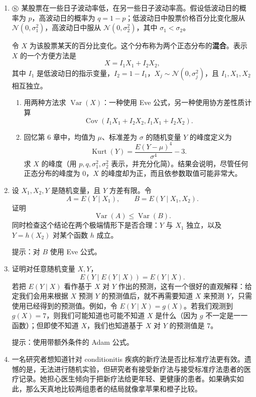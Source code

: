 \documentclass[UTF8,12pt,a4paper,fontset=fandol]{ctexart}
\begin{document}
\begin{enumerate}
  \item $\circledS$ 某股票在一些日子波动率低，在另一些日子波动率高。假设低波动日的概率为 $p$，高波动日的概率为 $q=1-p$；低波动日中股票价格百分比变化服从 $\mathcal N(0,\sigma_1^2)$，高波动日中服从 $\mathcal N(0,\sigma_2^2)$，其中 $\sigma_1<\sigma_2$。

  令 $X$ 为该股票某天的百分比变化。这个分布称为两个正态分布的\textbf{混合}。表示 $X$ 的一个方便方法是
  \[
    X=I_1X_1+I_2X_2,
  \]
  其中 $I_1$ 是低波动日的指示变量，$I_2=1-I_1$，$X_j\sim\mathcal N(0,\sigma_j^2)$，且 $I_1,X_1,X_2$ 相互独立。
  \begin{enumerate}
    \item[(a)] 用两种方法求 $\operatorname{Var}(X)$：一种使用 Eve 公式，另一种使用协方差性质计算
    \[
      \operatorname{Cov}(I_1X_1+I_2X_2,I_1X_1+I_2X_2).
    \]
    \item[(b)] 回忆第 6 章中，均值为 $\mu$、标准差为 $\sigma$ 的随机变量 $Y$ 的峰度定义为
    \[
      \operatorname{Kurt}(Y)=\frac{E(Y-\mu)^4}{\sigma^4}-3.
    \]
    求 $X$ 的峰度（用 $p,q,\sigma_1^2,\sigma_2^2$ 表示，并充分化简）。结果会说明，尽管任何正态分布的峰度为 $0$，$X$ 的峰度却为正，而且依参数取值可能非常大。
  \end{enumerate}

  \item 设 $X_1,X_2,Y$ 是随机变量，且 $Y$ 方差有限。令
  \[
    A=E(Y\mid X_1),\qquad B=E(Y\mid X_1,X_2).
  \]
  证明
  \[
    \operatorname{Var}(A)\le \operatorname{Var}(B).
  \]
  同时检查这个结论在两个极端情形下是否合理：$Y$ 与 $X_1$ 独立，以及 $Y=h(X_2)$ 对某个函数 $h$ 成立。

  \noindent 提示：对 $B$ 使用 Eve 公式。

  \item 证明对任意随机变量 $X,Y$，
  \[
    E(Y\mid E(Y\mid X))=E(Y\mid X).
  \]
  若把 $E(Y\mid X)$ 看作基于 $X$ 对 $Y$ 作出的预测，这有一个很好的直观解释：给定我们会用来根据 $X$ 预测 $Y$ 的预测值后，就不再需要知道 $X$ 来预测 $Y$，只需使用已经得到的预测值。例如，令 $E(Y\mid X)=g(X)$。若我们观测到 $g(X)=7$，则我们可能知道也可能不知道 $X$ 是什么（因为 $g$ 不一定是一一函数）；但即使不知道 $X$，我们也知道基于 $X$ 对 $Y$ 的预测值是 $7$。

  \noindent 提示：使用带额外条件的 Adam 公式。

  \item 一名研究者想知道针对 conditionitis 疾病的新疗法是否比标准疗法更有效。遗憾的是，无法进行随机实验，但研究者有接受新疗法与接受标准疗法患者的医疗记录。她担心医生倾向于把新疗法给更年轻、更健康的患者。如果确实如此，那么天真地比较两组患者的结局就像拿苹果和橙子比较。


\end{enumerate}
\end{document}
